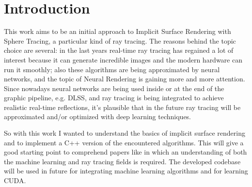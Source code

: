 
\section{Introduction}
This work aims to be an initial approach to Implicit Surface Rendering with Sphere Tracing, a particular kind of ray tracing.
The reasons behind the topic choice are several:
in the last years real-time ray tracing has regained a lot of interest because it can generate incredible images and the modern hardware can run it smoothly;
also these algorithms are being approximated by neural networks, and the topic of Neural Rendering is gaining more and more attention.
Since nowadays neural networks are being used inside or at the end of the graphic pipeline, e.g. DLSS, and ray tracing is being integrated to achieve realistic real-time reflections, it's plausible that in the future ray tracing will be approximated and/or optimized with deep learning techniques.

So with this work I wanted to understand the basics of implicit surface rendering and to implement a C++ version of the encountered algorithms.
This will give a good starting point to comprehend papers like \cite{nglod} in which an understanding of both the machine learning and ray tracing fields is required.
The developed codebase will be used in future for integrating machine learning algorithms and for learning CUDA.


